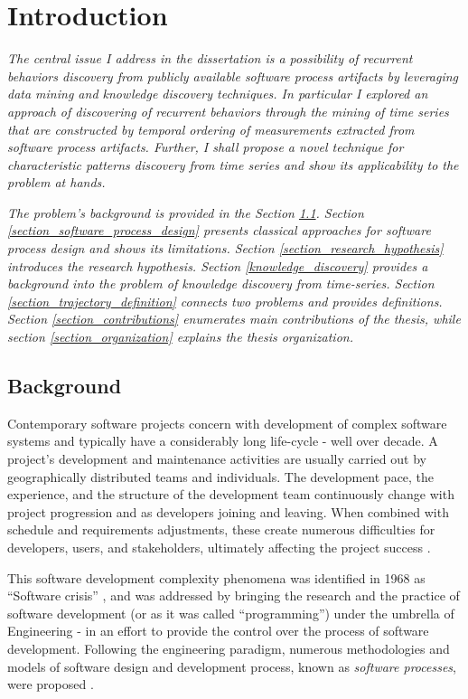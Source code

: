 \chapter{Introduction}\label{chapter_introduction}
\textit{The central issue I address in the dissertation is a possibility of recurrent behaviors discovery from 
publicly available software process artifacts by leveraging data mining and knowledge discovery techniques. 
In particular I explored an approach of discovering of recurrent behaviors through the mining of time series that
are constructed by temporal ordering of measurements extracted from software process artifacts.
Further, I shall propose a novel technique for characteristic patterns discovery from time series and show its 
applicability to the problem at hands.}

\textit{The problem's background is provided in the Section \ref{section_background}. 
Section \ref{section_software_process_design} presents classical approaches for software process design and shows its limitations.
Section \ref{section_research_hypothesis} introduces the research hypothesis.
Section \ref{knowledge_discovery} provides a background into the problem of knowledge discovery 
from time-series.
Section \ref{section_trajectory_definition} connects two problems and provides definitions.
Section \ref{section_contributions} enumerates main contributions of the thesis, 
while section \ref{section_organization} explains the thesis organization.}

%
%
\section{Background}\label{section_background}
Contemporary software projects concern with development of complex software systems and typically have 
a considerably long life-cycle - well over decade.
A project's development and maintenance activities are usually carried out by geographically 
distributed teams and individuals. The development pace, the experience, and the structure of the 
development team continuously change with project progression and as developers joining and leaving. 
When combined with schedule and requirements adjustments, these create numerous difficulties 
for developers, users, and stakeholders, ultimately affecting the project success \cite{citeulike:2207657}. 

This software development complexity phenomena was identified in 1968 as ``Software crisis'' 
\cite{naur_crisis_68}, and was addressed by bringing the research and the practice of software development 
(or as it was called ``programming'') under the umbrella of Engineering - in an effort to provide 
the control over the process of software development. 
Following the engineering paradigm, numerous methodologies and models of software design and development 
process, known as \textit{software processes}, were proposed \cite{citeulike:10002165}.

